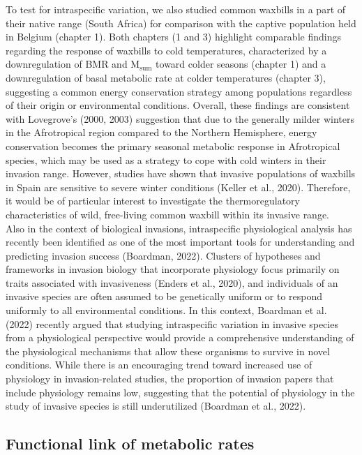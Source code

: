 \documentclass[10pt, twoside]{book} %
\begin{document}
To test for intraspecific variation, we also studied common waxbills in a part of their native range (South Africa) for comparison with the captive population held in Belgium (chapter 1). Both chapters (1 and 3) highlight comparable findings regarding the response of waxbills to cold temperatures, characterized by a downregulation of BMR and M$_{\text{sum}}$ toward colder seasons (chapter 1) and a downregulation of basal metabolic rate at colder temperatures (chapter 3), suggesting a common energy conservation strategy among populations regardless of their origin or environmental conditions. Overall, these findings are consistent with Lovegrove's (2000, 2003) suggestion that due to the generally milder winters in the Afrotropical region compared to the Northern Hemisphere, energy conservation becomes the primary seasonal metabolic response in Afrotropical species, which may be used as a strategy to cope with cold winters in their invasion range. However, studies have shown that invasive populations of waxbills in Spain are sensitive to severe winter conditions (Keller et al., 2020). Therefore, it would be of particular interest to investigate the thermoregulatory characteristics of wild, free-living common waxbill within its invasive range. \\

Also in the context of biological invasions, intraspecific physiological analysis has recently been identified as one of the most important tools for understanding and predicting invasion success (Boardman, 2022). Clusters of hypotheses and frameworks in invasion biology that incorporate physiology focus primarily on traits associated with invasiveness (Enders et al., 2020), and individuals of an invasive species are often assumed to be genetically uniform or to respond uniformly to all environmental conditions. In this context, Boardman et al. (2022) recently argued that studying intraspecific variation in invasive species from a physiological perspective would provide a comprehensive understanding of the physiological mechanisms that allow these organisms to survive in novel conditions. While there is an encouraging trend toward increased use of physiology in invasion-related studies, the proportion of invasion papers that include physiology remains low, suggesting that the potential of physiology in the study of invasive species is still underutilized (Boardman et al., 2022). \\

\subsection{Functional link of metabolic rates}
\end{document}
